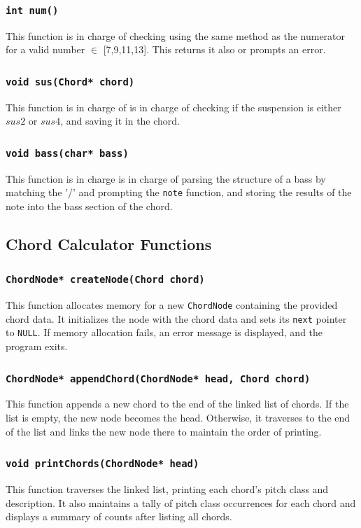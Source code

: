 \documentclass{article}
\begin{document}
\subsubsection{\texttt{int num()}}
This function is in charge of checking using the same method as the numerator for a valid number $\in$ [7,9,11,13]. This returns it also or prompts an error.
\subsubsection{\texttt{void sus(Chord* chord)}}
This function is in charge of is in charge of checking if the suspension is either $sus2$ or $sus4$, and saving it in the chord.
\subsubsection{\texttt{void bass(char* bass)}}
This function is in charge  is in charge of parsing the structure of a bass by matching the '/' and prompting the \texttt{note} function, and storing the results of the note into the bass section of the chord.

\subsection{Chord Calculator Functions}
\subsubsection{\texttt{ChordNode* createNode(Chord chord)}} This function allocates memory for a new \texttt{ChordNode} containing the provided chord data. It initializes the node with the chord data and sets its \texttt{next} pointer to \texttt{NULL}. If memory allocation fails, an error message is displayed, and the program exits.

\subsubsection{\texttt{ChordNode* appendChord(ChordNode* head, Chord chord)}} This function appends a new chord to the end of the linked list of chords. If the list is empty, the new node becomes the head. Otherwise, it traverses to the end of the list and links the new node there to maintain the order of printing.

\subsubsection{\texttt{void printChords(ChordNode* head)}} This function traverses the linked list, printing each chord's pitch class and description. It also maintains a tally of pitch class occurrences for each chord and displays a summary of counts after listing all chords.
\end{document}
